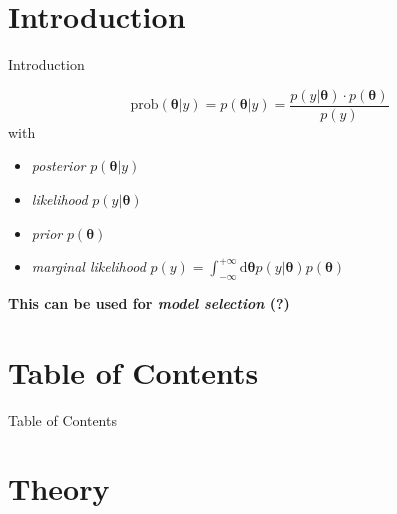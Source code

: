 \documentclass[11pt,aspectratio=1610,dvipsnames]{beamer}
\newcommand{\btheta}{\boldsymbol{\theta}}
\begin{document}

\section*{Introduction}
\begin{frame}{Introduction}
	\begin{tcolorbox}[colback=black!5,colframe=gray!15!black,title=\textsc{Bayes'} Theorem] 
		$$\text{prob}(\btheta|y)=p(\btheta|y)= \frac{p(y|\boldsymbol{\theta})\cdot p(\boldsymbol{\theta})}{p(y)}$$
		with
		\begin{itemize}
			\item \emph{posterior} $p(\btheta|y)$\\
			\item \emph{likelihood} $p(y|\boldsymbol{\theta})$\\
			\item \emph{prior} $p(\boldsymbol{\theta})$\\
			\item \emph{marginal likelihood} $p(y)=\int_{-\infty}^{+\infty}\text{d}\boldsymbol{\theta} p(y|\boldsymbol{\theta})p(\boldsymbol{\theta})$\\
		\end{itemize}
	\begin{center}
		\textbf{This can be used for \emph{model selection} (?)}
	\end{center}
\end{tcolorbox}
\end{frame}


\section*{Table of Contents}

\begin{frame}{Table of Contents}
	\tableofcontents
\end{frame}

\section{Theory}
\end{document}
